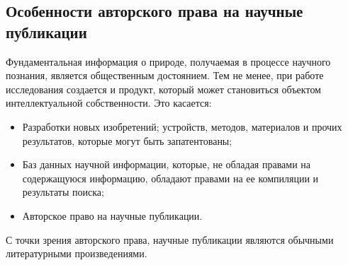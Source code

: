 \documentclass[10pt, a5paper]{article}
\begin{document}
\subsection*{Особенности авторского права на научные публикации}

Фундаментальная информация о природе, получаемая в процессе научного познания, является общественным достоянием. Тем не менее, при работе исследования создается и продукт, который может становиться объектом интеллектуальной собственности. Это касается:
\begin{itemize}
  \item Разработки новых изобретений; устройств, методов, материалов и прочих результатов, которые могут быть запатентованы;
  \item Баз данных научной информации, которые, не обладая правами на содержащуюся информацию, обладают правами на ее компиляции и результаты поиска;
  \item Авторское право на научные публикации.
\end{itemize}

С точки зрения авторского права, научные публикации являются обычными литературными произведениями.
\end{document}

